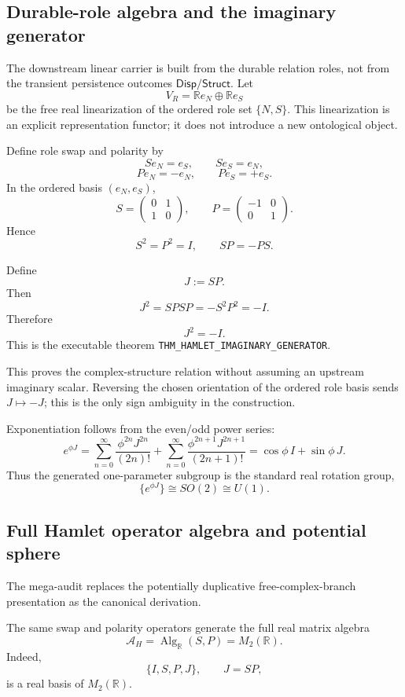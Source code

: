 \documentclass[11pt]{article}
\newcommand{\claimid}[1]{\nolinkurl{#1}}
\begin{document}
\subsection{Durable-role algebra and the imaginary generator}

The downstream linear carrier is built from the durable relation roles, not
from the transient persistence outcomes \(\mathsf{Disp}/\mathsf{Struct}\).
Let
\[
\boxed{
V_R=\mathbb R e_N\oplus\mathbb R e_S
}
\]
be the free real linearization of the ordered role set \(\{N,S\}\). This
linearization is an explicit representation functor; it does not introduce a
new ontological object.

Define role swap and polarity by
\[
S e_N=e_S,
\qquad
S e_S=e_N,
\]
\[
P e_N=-e_N,
\qquad
P e_S=+e_S.
\]
In the ordered basis \((e_N,e_S)\),
\[
S=
\begin{pmatrix}
0&1\\
1&0
\end{pmatrix},
\qquad
P=
\begin{pmatrix}
-1&0\\
0&1
\end{pmatrix}.
\]
Hence
\[
S^2=P^2=I,
\qquad
SP=-PS.
\]

Define
\[
\boxed{J:=SP.}
\]
Then
\[
J^2
=
SPSP
=
-S^2P^2
=
-I.
\]
Therefore
\[
\boxed{J^2=-I.}
\]
This is the executable theorem
\claimid{THM_HAMLET_IMAGINARY_GENERATOR}.

This proves the complex-structure relation without assuming an upstream
imaginary scalar. Reversing the chosen orientation of the ordered role basis
sends \(J\mapsto-J\); this is the only sign ambiguity in the construction.

Exponentiation follows from the even/odd power series:
\[
e^{\phi J}
=
\sum_{n=0}^{\infty}\frac{\phi^{2n}J^{2n}}{(2n)!}
+
\sum_{n=0}^{\infty}\frac{\phi^{2n+1}J^{2n+1}}{(2n+1)!}
=
\cos\phi\,I+\sin\phi\,J.
\]
Thus the generated one-parameter subgroup is the standard real rotation group,
\[
\boxed{
\{e^{\phi J}\}\cong SO(2)\cong U(1).
}
\]

\subsection{Full Hamlet operator algebra and potential sphere}

The mega-audit replaces the potentially duplicative free-complex-branch
presentation as the canonical derivation.

The same swap and polarity operators generate the full real matrix algebra
\[
\boxed{
\mathcal A_H
=
\operatorname{Alg}_{\mathbb R}(S,P)
=
M_2(\mathbb R).
}
\]
Indeed,
\[
\{I,S,P,J\},
\qquad J=SP,
\]
is a real basis of \(M_2(\mathbb R)\).
\end{document}
